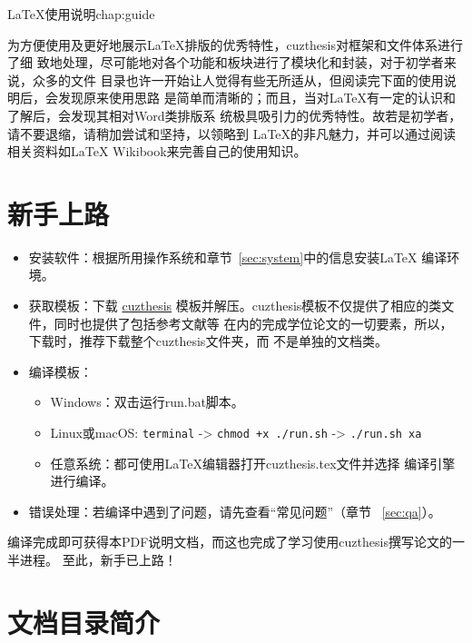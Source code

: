 \begin{cuzchapter}{\LaTeX{}使用说明}{chap:guide}

为方便使用及更好地展示\LaTeX{}排版的优秀特性，cuzthesis对框架和文件体系进行了细
致地处理，尽可能地对各个功能和板块进行了模块化和封装，对于初学者来说，众多的文件
目录也许一开始让人觉得有些无所适从，但阅读完下面的使用说明后，会发现原来使用思路
是简单而清晰的；而且，当对\LaTeX{}有一定的认识和了解后，会发现其相对Word类排版系
统极具吸引力的优秀特性。故若是初学者，请不要退缩，请稍加尝试和坚持，以领略到
\LaTeX{}的非凡魅力，并可以通过阅读相关资料如\LaTeX{}
Wikibook\citep{wikibook2014latex}来完善自己的使用知识。

\section{新手上路}\label{sec:newbie}

\begin{itemize}
    \item 安装软件：根据所用操作系统和章节~\ref{sec:system}中的信息安装\LaTeX{}
    编译环境。
    \item 获取模板：下载 \href{https://github.com/xiehao/CUZThesis}{cuzthesis}
    模板并解压。cuzthesis模板不仅提供了相应的类文件，同时也提供了包括参考文献等
    在内的完成学位论文的一切要素，所以，下载时，推荐下载整个cuzthesis文件夹，而
    不是单独的文档类。
    \item 编译模板：
        \begin{itemize}
            \item Windows：双击运行run.bat脚本。
            \item Linux或macOS: {\small \verb|terminal| -> \verb|chmod +x ./run.sh| -> \verb|./run.sh xa|}
            \item 任意系统：都可使用\LaTeX{}编辑器打开cuzthesis.tex文件并选择
            编译引擎进行编译。
        \end{itemize}
    \item 错误处理：若编译中遇到了问题，请先查看“常见问题”（章节
    ~\ref{sec:qa}）。
\end{itemize}

编译完成即可获得本PDF说明文档，而这也完成了学习使用cuzthesis撰写论文的一半进程。
至此，新手已上路！

\section{文档目录简介}\label{sec:directory}


\end{cuzchapter}
